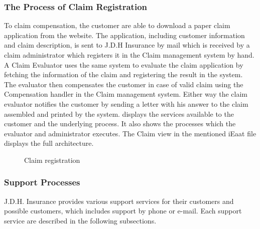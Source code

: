 \subsubsection{The Process of Claim Registration}
\label{sec:claim}
To claim compensation, the customer are able to download a paper claim application from the website. The application, including customer information and claim description, is sent to J.D.H Insurance by mail which is received by a claim administrator which registers it in the Claim management system by hand. A Claim Evaluator uses the same system to evaluate the claim application by fetching the information of the claim and registering the result in the system. The evaluator then compensates the customer in case of valid claim using the Compensation handler in the Claim management system. Either way the claim evaluator notifies the customer by sending a letter with his answer to the claim assembled and printed by the system.  displays the services available to the customer and the underlying process. It also shows the processes which the evaluator and administrator executes. The Claim view in the mentioned iEaat file displays the full architecture.  
\begin{center}
	\begin{figure}[H]
		\centering
		\setlength\fboxsep{7pt}
		\setlength\fboxrule{0.5pt}
		\caption{Claim registration}
		\label{fig:map_claim}
	\end{figure}
\end{center}
%
\subsubsection{Support Processes}
\label{sec:support_processes}
J.D.H. Insurance provides various support services for their customers and possible customers, which includes support by phone or e-mail. Each support service are described in the following subsections.
